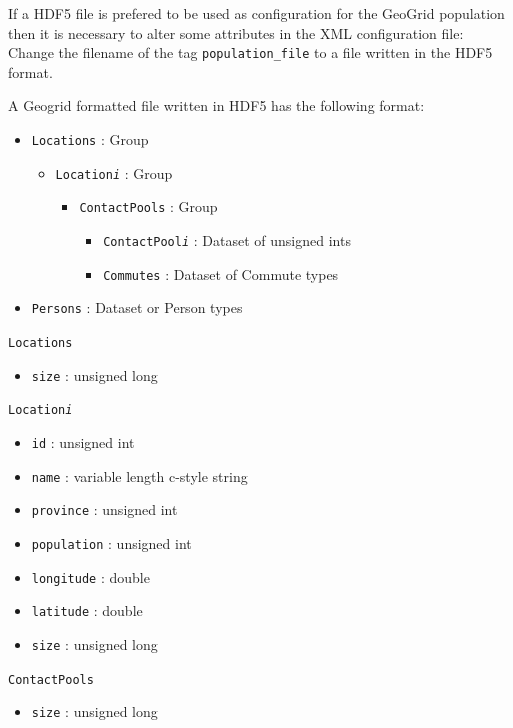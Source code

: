 If a HDF5 file is prefered to be used as configuration for the GeoGrid population then it is necessary to alter some attributes in the XML configuration file:\\
Change the filename of the tag \texttt{population\_file} to a file written in the HDF5 format.

A Geogrid formatted file written in HDF5 has the following format:

\begin{itemize}
\item \texttt{Locations} : Group
	\begin{itemize}
		\item \texttt{Location\textit{i}} : Group
			\begin{itemize}
				\item \texttt{ContactPools} : Group
					\begin{itemize}
						\item \texttt{ContactPool\textit{i}} : Dataset of unsigned ints
						\item \texttt{Commutes} : Dataset of Commute types
					\end{itemize}						
			\end{itemize}
	\end{itemize}
\item \texttt{Persons} : Dataset or Person types
\end{itemize}

\texttt{Locations}
\begin{itemize}
\item \texttt{size} : unsigned long
\end{itemize}

\texttt{Location\textit{i}}
\begin{itemize}
\item \texttt{id} : unsigned int 
\item \texttt{name} : variable length c-style string 
\item \texttt{province} : unsigned int 
\item \texttt{population} : unsigned int 
\item \texttt{longitude} : double
\item \texttt{latitude} : double
\item \texttt{size} : unsigned long
\end{itemize}

\texttt{ContactPools}
\begin{itemize}
\item \texttt{size} : unsigned long
\end{itemize}

